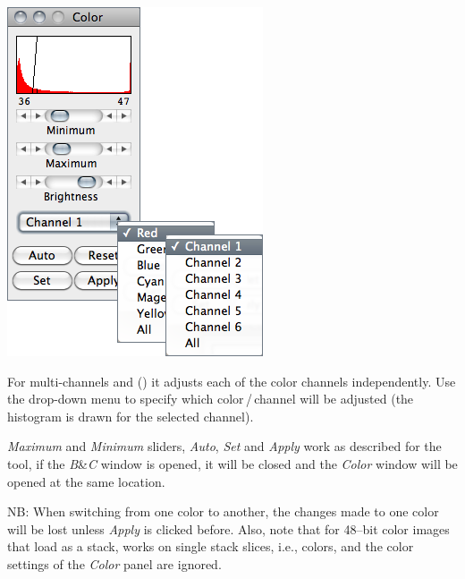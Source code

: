 \begin{minipage}[c][1\totalheight][t]{0.405\columnwidth}%
\includegraphics[scale=0.55]{images/ColorBalance}%
\end{minipage}%
\begin{minipage}[c][1\totalheight][t]{0.595\columnwidth}%
For multi-channels  and 
() it adjusts each of the color channels
independently. Use the drop-down menu to specify which color\,/\,channel
will be adjusted (the histogram is drawn for the selected channel).

\medskip{}
\emph{Maximum} and \emph{Minimum} sliders, \emph{Auto}, \emph{Set}
and \emph{Apply} work as described for the  tool,
if the \emph{B}\&\emph{C} window is opened, it will be closed and
the \emph{Color }window will be opened at the same location.

\medskip{}
NB: When switching from one color to another, the changes made to
one color will be lost unless \emph{Apply} is clicked before. Also,
note that for 48--bit color images that load as a stack, 
works on single stack slices, i.e., colors, and the color settings
of the \emph{Color} panel are ignored.%
\end{minipage}



